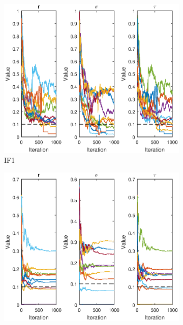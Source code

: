 \documentclass[twoside,openright]{report}
\begin{document}
\begin{figure}
        \centering
        \begin{subfigure}[b]{0.7\textwidth}
            \centering
            \includegraphics[width=\textwidth]{./fig_gompertz/IF1_3_par}
            \caption[]%
            { \small IF1 }     
            \label{fig:mean and std of net14}
        \end{subfigure}
        \begin{subfigure}[b]{0.7\textwidth}  
            \centering 
            \includegraphics[width=\textwidth]{./fig_gompertz/IF2_3_par}

\end{subfigure}
\end{figure}
\end{document}
